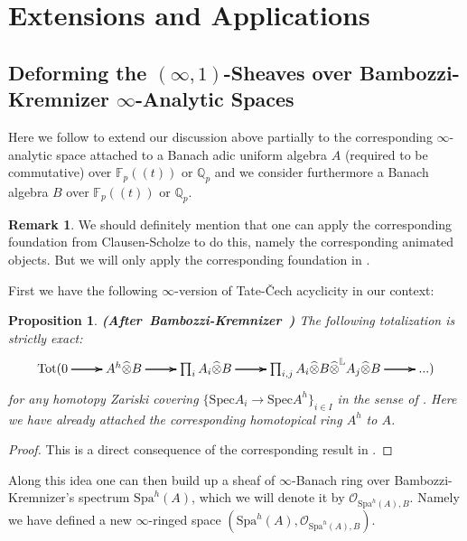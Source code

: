 \documentclass[12pt]{amsart}
\newtheorem{proposition}[theorem]{Proposition}
\theoremstyle{definition}
\newtheorem{remark}[theorem]{Remark}
\numberwithin{equation}{section}
\begin{document}
\newpage


\section{Extensions and Applications}

\subsection{Deforming the $(\infty,1)$-Sheaves over Bambozzi-Kremnizer $\infty$-Analytic Spaces}


\noindent Here we follow \cite{BK1} to extend our discussion above partially to the corresponding $\infty$-analytic space attached to a Banach adic uniform algebra $A$ (required to be commutative) over $\mathbb{F}_p((t))$ or $\mathbb{Q}_p$ and we consider furthermore a Banach algebra $B$ over $\mathbb{F}_p((t))$ or $\mathbb{Q}_p$.  

\begin{remark}
We should definitely mention that one can apply the corresponding foundation from Clausen-Scholze \cite{CS} to do this, namely the corresponding animated objects. But we will only apply the corresponding foundation in \cite{BK1}. 
\end{remark}

\indent First we have the following $\infty$-version of Tate-\v{C}ech acyclicity in our context:


\begin{proposition}\mbox{\bf{(After Bambozzi-Kremnizer \cite[Theorem 4.15]{BK1})}} 
The following totalization is strictly exact:
\[
\xymatrix@C+0pc@R+0pc{
\mathrm{Tot}(0  \ar[r]\ar[r]\ar[r] &A^h\widehat{\otimes} B \ar[r]\ar[r]\ar[r] & \prod_i A_i\widehat{\otimes} B \ar[r]\ar[r]\ar[r] &\prod_{i,j} A_i\widehat{\otimes} B \widehat{\otimes}^\mathbb{L} A_j\widehat{\otimes}B\ar[r]\ar[r]\ar[r] &...)
}
\]
for any homotopy Zariski covering $\{\mathrm{Spec}A_i\rightarrow \mathrm{Spec}A^h\}_{i\in I}$ in the sense of \cite[Theorem 4.15]{BK1}. Here we have already attached the corresponding homotopical ring $A^h$ to $A$.
\end{proposition}


\begin{proof}
This is a direct consequence of the corresponding result in \cite[Theorem 4.15]{BK1}.	
\end{proof}

\indent Along this idea one can then build up a sheaf of $\infty$-Banach ring over Bambozzi-Kremnizer's spectrum $\mathrm{Spa}^h(A)$, which we will denote it by $\mathcal{O}_{\mathrm{Spa}^h(A),B}$. Namely we have defined a new $\infty$-ringed space $(\mathrm{Spa}^h(A),\mathcal{O}_{\mathrm{Spa}^h(A),B})$.
\end{document}
